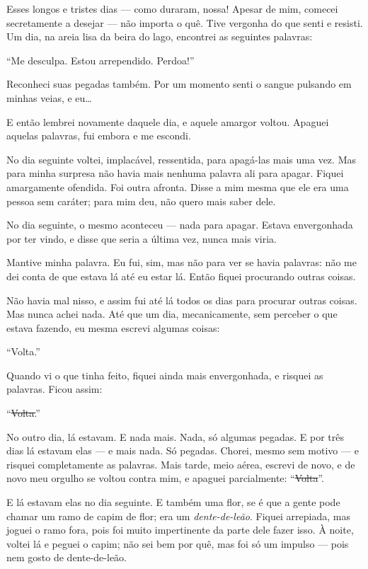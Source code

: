 Esses longos e tristes dias --- como duraram, nossa! Apesar de mim, comecei
secretamente a desejar --- não importa o quê. Tive vergonha do que
senti e resisti. Um dia, na areia lisa da beira do lago, encontrei as seguintes
palavras:

“Me desculpa. Estou arrependido. Perdoa!”

Reconheci suas pegadas também. Por um momento senti o sangue pulsando em minhas
veias, e eu\ldots{}

E então lembrei novamente daquele dia, e aquele amargor voltou. Apaguei aquelas
palavras, fui embora e me escondi.

No dia seguinte voltei, implacável, ressentida, para apagá-las mais uma vez. Mas
para minha surpresa não havia mais nenhuma palavra ali para apagar. Fiquei amargamente ofendida.
Foi outra afronta. Disse a mim mesma que ele era uma pessoa sem caráter; para mim deu, não
quero mais saber dele.

No dia seguinte, o mesmo aconteceu --- nada para apagar. Estava envergonhada
por ter vindo, e disse que seria a última vez, nunca mais viria.

Mantive minha palavra. Eu fui, sim, mas não para ver se havia palavras: não me
dei conta de que estava lá até eu estar lá. Então fiquei procurando outras coisas.

Não havia mal nisso, e assim fui até lá todos os dias para procurar outras coisas.
Mas nunca achei nada. Até que um dia, mecanicamente, sem perceber
o que estava fazendo, eu mesma escrevi algumas coisas:

“Volta.”

Quando vi o que tinha feito, fiquei ainda mais envergonhada, e risquei as
palavras. Ficou assim:

“\st{Volta.}”

No outro dia, lá estavam. E nada mais. Nada, só algumas pegadas. E por três
dias lá estavam elas --- e mais nada. Só pegadas. Chorei, mesmo sem motivo --- 
e risquei completamente as palavras. Mais tarde, meio
aérea, escrevi de novo, e de novo meu orgulho se voltou contra mim, e
apaguei parcialmente: “\st{Volta}”.

E lá estavam elas no dia seguinte. E também uma flor, se é que a gente pode chamar
um ramo de capim de flor; era um \textit{dente-de-leão}. Fiquei arrepiada, mas
joguei o ramo fora, pois foi muito impertinente da parte dele fazer isso. À noite,
voltei lá e peguei o capim; não sei bem por quê, mas foi só um impulso --- pois nem
gosto de dente-de-leão.

